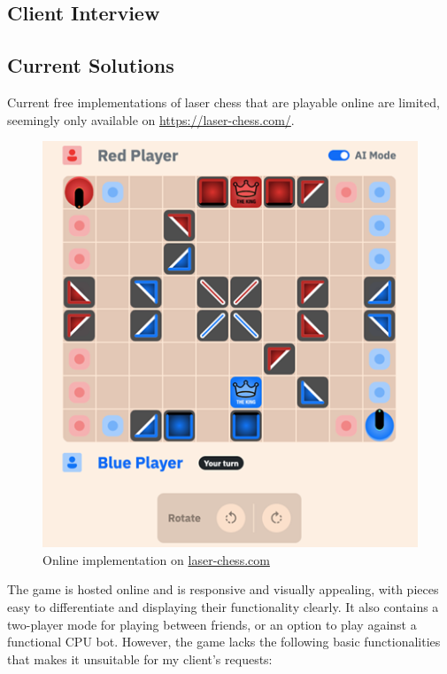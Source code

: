 \documentclass[../main/main.tex]{subfiles}
\begin{document}
\subsection{Client Interview}

\subsection{Current Solutions}
Current free implementations of laser chess that are playable online are limited, seemingly only available on \url{https://laser-chess.com/}.

\begin{figure}[ht!]
    \centering
    \includegraphics[width=0.6\columnwidth]{../analysis/assets/laser_chess_com.png}
    \caption{Online implementation on \href{https://laser-chess.com/}{laser-chess.com}}
    \label{fig:laser-chess-com}
\end{figure}

The game is hosted online and is responsive and visually appealing, with pieces easy to differentiate and displaying their functionality clearly. It also contains a two-player mode for playing between friends, or an option to play against a functional CPU bot. However, the game lacks the following basic functionalities that makes it unsuitable for my client’s requests:
\end{document}
